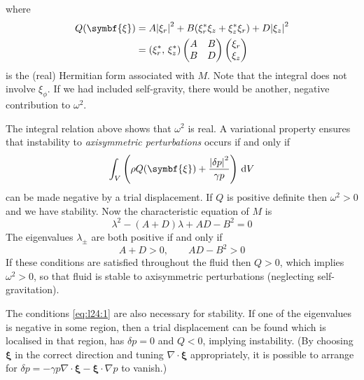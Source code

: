 \documentclass{jknotes}
\newcommand{\disp}{\symbf{\xi}}
\begin{document}
where
\begin{align}
	Q(\disp) &= A\abs{\xi_r}^2 + B(\xi_r^* \xi_z + \xi_z^* \xi_r) +
	D\abs{\xi_z}^2 \\
	 &= \left( \xi_r^*, \, \xi_z^*\right) \begin{pmatrix} A & B \\ B &
		D \end{pmatrix} \begin{pmatrix} \xi_r \\ \xi_z \end{pmatrix}
\end{align}
is the (real) Hermitian form associated with $M$. Note that the integral does
not involve $\xi_\phi$. If we had included self-gravity, there would be
another, negative contribution to $\omega^2$. 

The integral relation above shows that $\omega^2$ is real. A variational property
ensures that instability to \emph{axisymmetric perturbations} occurs if and
only if
\begin{equation}
	\int_V \left(\rho Q(\disp) + \frac{\abs{\delta p}^2}{\gamma
	p}\right)\,\diffd V
\end{equation}
can be made negative by a trial displacement. If $Q$ is positive definite then
$\omega^2 > 0$ and we have stability. Now the characteristic equation of $M$
is
\begin{equation}
	\lambda^2 - (A+D)\lambda + AD - B^2 = 0
\end{equation}
The eigenvalues $\lambda_\pm$ are both positive if and only if
\begin{equation}
	A + D > 0, \hspace{2em} AD - B^2 > 0 \label{eq:l24:1}
\end{equation}
If these conditions are satisfied throughout the fluid then $Q > 0$, which
implies $\omega^2 > 0$, so that fluid is stable to axisymmetric perturbations
(neglecting self-gravitation).

The conditions \eqref{eq:l24:1} are also necessary for stability. If one of
the eigenvalues is negative in some region, then a trial displacement can be
found which is localised in that region, has $\delta p = 0$ and $Q < 0$,
implying instability. (By choosing $\disp$ in the correct direction and tuning
$\nabla \cdot \disp$ appropriately, it is possible to arrange for $\delta p =
-\gamma p \nabla \cdot \disp - \disp \cdot \nabla p$ to vanish.)
\end{document}
